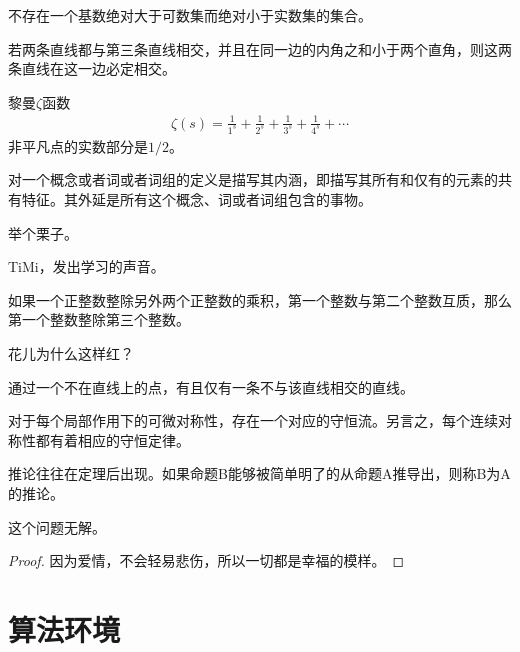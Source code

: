 \begin{assumption}[连续统假设]
    不存在一个基数绝对大于可数集而绝对小于实数集的集合。
\end{assumption}
\begin{axiom}[平行公理]
    若两条直线都与第三条直线相交，并且在同一边的内角之和小于两个直角，则这两条直线在这一边必定相交。
\end{axiom}
\begin{conjecture}[黎曼猜想]
    黎曼$\zeta$函数
    \begin{align}
        \zeta(s) = \frac{1}{1^s} + \frac{1}{2^s} + \frac{1}{3^s} + \frac{1}{4^s} + \cdots
    \end{align}
    非平凡点的实数部分是$1/2$。
\end{conjecture}
\begin{definition}[定义的定义]
    对一个概念或者词或者词组的定义是描写其内涵，即描写其所有和仅有的元素的共有特征。其外延是所有这个概念、词或者词组包含的事物。
\end{definition}
\begin{example}
    举个栗子。
\end{example}
\begin{exercise}
    TiMi，发出学习的声音。
\end{exercise}
\begin{lemma}[欧几里得引理]
    如果一个正整数整除另外两个正整数的乘积，第一个整数与第二个整数互质，那么第一个整数整除第三个整数。
\end{lemma}
\begin{problem}
    花儿为什么这样红？
\end{problem}
\begin{proposition}
    通过一个不在直线上的点，有且仅有一条不与该直线相交的直线。
\end{proposition}
\begin{theorem}[诺特定理]
    对于每个局部作用下的可微对称性，存在一个对应的守恒流。另言之，每个连续对称性都有着相应的守恒定律。
\end{theorem}
\begin{corollary}
    推论往往在定理后出现。如果命题B能够被简单明了的从命题A推导出，则称B为A的推论。
\end{corollary}
\begin{solution}
    这个问题无解。
\end{solution}
\begin{proof}
    因为爱情，不会轻易悲伤，所以一切都是幸福的模样。
\end{proof}

\section{算法环境}

